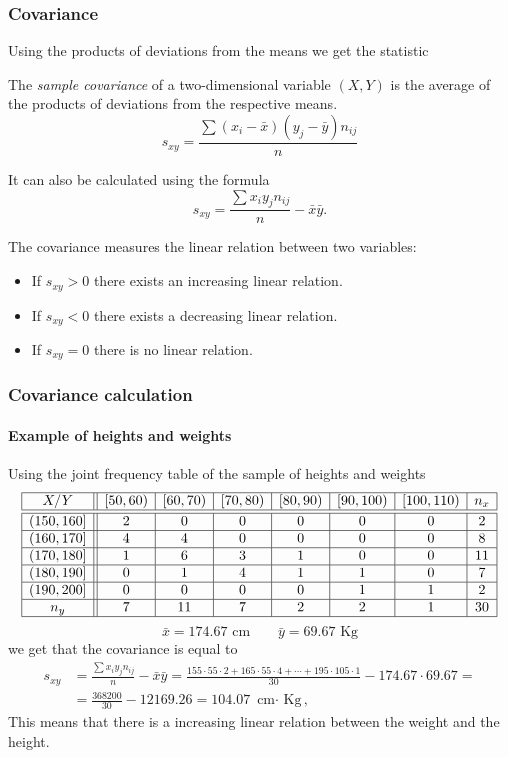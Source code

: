 \begin{frame}
\frametitle{Covariance}
Using the products of deviations from the means we get the statistic
\begin{definition}
The \emph{sample covariance} of a two-dimensional variable $(X,Y)$ is the average of the products of deviations from the respective means.
\[
s_{xy}=\frac{\sum (x_i-\bar x)(y_j-\bar y)n_{ij}}{n}
\]
\end{definition}
It can also be calculated using the formula
\[
s_{xy}=\frac{\sum x_iy_jn_{ij}}{n}-\bar x\bar y.
\]

The covariance measures the linear relation between two variables:
\begin{itemize}
\item If $s_{xy}>0$ there exists an increasing linear relation.
\item If $s_{xy}<0$ there exists a decreasing linear relation.
\item If $s_{xy}=0$ there is no linear relation.
\end{itemize}
\end{frame}


\begin{frame}
\frametitle{Covariance calculation}
\framesubtitle{Example of heights and weights}
Using the joint frequency table of the sample of heights and weights
\[
\begin{array}{|c||c|c|c|c|c|c|c|}
\hline
  X/Y & [50,60) & [60,70) & [70,80) & [80,90) & [90,100) & [100,110) & n_x\\
  \hline\hline
  (150,160] & 2 & 0 & 0 & 0 & 0 & 0 & 2\\
  \hline
  (160,170] & 4 & 4 & 0 & 0 & 0 & 0 & 8\\
  \hline
  (170,180] & 1 & 6 & 3 & 1 & 0 & 0 & 11 \\
  \hline
  (180,190] & 0 & 1 & 4 & 1 & 1 & 0 & 7 \\
  \hline
  (190,200] & 0 & 0 & 0 & 0 & 1 & 1 & 2\\
  \hline
  n_y & 7 & 11 & 7 & 2 & 2 & 1 & 30\\
  \hline
\end{array}
\]
\[
\bar x = 174.67 \mbox{ cm} \qquad \bar y = 69.67 \mbox{ Kg}
\]
we get that the covariance is equal to 
\begin{align*}
s_{xy} &=\frac{\sum x_iy_jn_{ij}}{n}-\bar x\bar y =  \frac{155\cdot 55\cdot 2 + 165\cdot 55\cdot 4 + \cdots + 195\cdot 105\cdot 1}{30}-174.67\cdot 69.67 =\\
& = \frac{368200}{30}-12169.26 = 104.07 \mbox{ cm$\cdot$ Kg},
\end{align*}
This means that there is a increasing linear relation between the weight and the height.
\end{frame}



